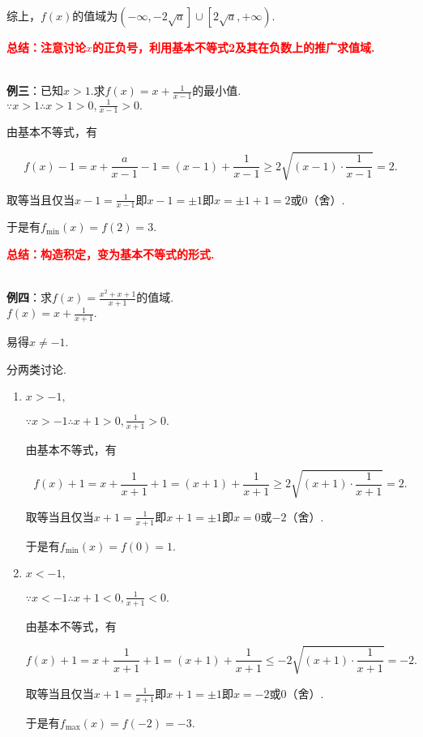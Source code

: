 \documentclass[8pt]{article}
\begin{document}
					综上，$f(x)$的值域为$\left(-\infty, -2\sqrt{a}\right]\cup\left[2\sqrt{a}, +\infty\right)$.

					\textcolor{red}{\textbf{总结：注意讨论$x$的正负号，利用基本不等式2及其在负数上的推广求值域.}}

				~\\

				\textbf{例三}：已知$x>1$.求$f(x)=x+\frac{1}{x-1}$的最小值.
					~\\

					$\because x>1 \therefore x>1>0, \frac{1}{x-1}>0.$

					由基本不等式，有

					$$f(x)-1=x+\frac{a}{x-1}-1=(x-1)+\frac{1}{x-1}\geq2\sqrt{(x-1)\cdot\frac{1}{x-1}}=2.$$

					取等当且仅当$x-1=\frac{1}{x-1}$即$x-1=\pm1$即$x=\pm1+1=2$或$0$（舍）.

					于是有$f_{\min}(x)=f(2)=3.$

					\textcolor{red}{\textbf{总结：构造积定，变为基本不等式的形式.}}

				~\\

				\textbf{例四}：求$\displaystyle f(x)=\frac{x^2+x+1}{x+1}$的值域.
					~\\

					$f(x)=x+\frac{1}{x+1}.$

					易得$x\neq-1$.

					分两类讨论.

					\begin{enumerate}[label=$\arabic*^{\circ}$]
						\item
							$x>-1,$

							$\because x>-1 \therefore x+1>0, \frac{1}{x+1}>0.$

							由基本不等式，有

							$$f(x)+1=x+\frac{1}{x+1}+1=(x+1)+\frac{1}{x+1}\geq2\sqrt{(x+1)\cdot\frac{1}{x+1}}=2.$$

							取等当且仅当$x+1=\frac{1}{x+1}$即$x+1=\pm1$即$x=0$或$-2$（舍）.

							于是有$f_{\min}(x)=f(0)=1.$

						\item
							$x<-1,$

							$\because x<-1 \therefore x+1<0, \frac{1}{x+1}<0.$

							由基本不等式，有

							$$f(x)+1=x+\frac{1}{x+1}+1=(x+1)+\frac{1}{x+1}\leq-2\sqrt{(x+1)\cdot\frac{1}{x+1}}=-2.$$

							取等当且仅当$x+1=\frac{1}{x+1}$即$x+1=\pm1$即$x=-2$或$0$（舍）.

							于是有$f_{\max}(x)=f(-2)=-3.$

					\end{enumerate}
\end{document}
